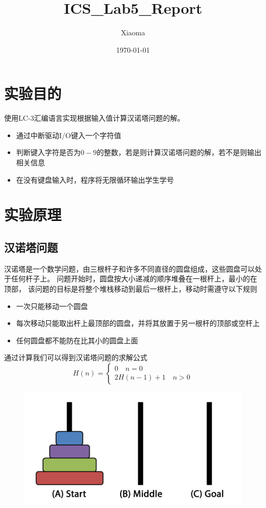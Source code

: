 \documentclass[12pt, a4paper, oneside]{ctexart}
\title{ICS\_Lab5\_Report}
\author{Xiaoma}
\date{\today}
\begin{document}
\maketitle
\section*{实验目的}
使用LC-3汇编语言实现根据输入值计算汉诺塔问题的解。
\begin{itemize}
    \item 通过中断驱动I/O键入一个字符值
    \item 判断键入字符是否为$0-9$的整数，若是则计算汉诺塔问题的解，若不是则输出相关信息
    \item 在没有键盘输入时，程序将无限循环输出学生学号
\end{itemize}
\section*{实验原理}
\subsection*{汉诺塔问题}
汉诺塔是一个数学问题，由三根杆子和许多不同直径的圆盘组成，这些圆盘可以处于任何杆子上。
问题开始时，圆盘按大小递减的顺序堆叠在一根杆上，最小的在顶部，
该问题的目标是将整个堆栈移动到最后一根杆上，移动时需遵守以下规则
\begin{itemize}
    \item 一次只能移动一个圆盘
    \item 每次移动只能取出杆上最顶部的圆盘，并将其放置于另一根杆的顶部或空杆上
    \item 任何圆盘都不能防在比其小的圆盘上面
\end{itemize}
通过计算我们可以得到汉诺塔问题的求解公式
$$H(n)=\begin{cases}
    0 \quad n = 0\\
    2H(n-1) + 1 \quad n > 0
\end{cases}$$
\begin{figure}[H]
    \centering
    \includegraphics[scale=0.75]{3.png}
\end{figure}
\end{document}

